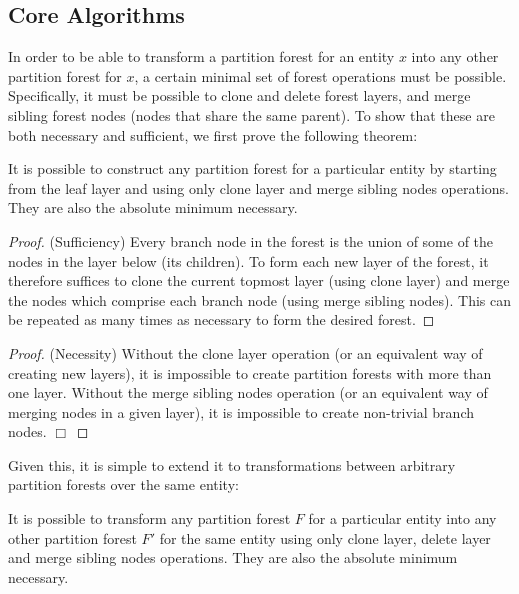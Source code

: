 \subsection{Core Algorithms}

In order to be able to transform a partition forest for an entity $x$ into any other partition forest for $x$, a certain minimal set of forest operations must be possible. Specifically, it must be possible to clone and delete forest layers, and merge sibling forest nodes (nodes that share the same parent). To show that these are both necessary and sufficient, we first prove the following theorem:

\begin{theorem}
\label{thrm:ipfs-construction}
It is possible to construct any partition forest for a particular entity by starting from the leaf layer and using only clone layer and merge sibling nodes operations. They are also the absolute minimum necessary.
\end{theorem}

\begin{proof}
(Sufficiency) Every branch node in the forest is the union of some of the nodes in the layer below (its children). To form each new layer of the forest, it therefore suffices to clone the current topmost layer (using clone layer) and merge the nodes which comprise each branch node (using merge sibling nodes). This can be repeated as many times as necessary to form the desired forest.
\end{proof}

\begin{proof}
(Necessity) Without the clone layer operation (or an equivalent way of creating new layers), it is impossible to create partition forests with more than one layer. Without the merge sibling nodes operation (or an equivalent way of merging nodes in a given layer), it is impossible to create non-trivial branch nodes. $\Box$
\end{proof}

\noindent Given this, it is simple to extend it to transformations between arbitrary partition forests over the same entity:

\begin{theorem}
\label{thrm:ipfs-transformation}
It is possible to transform any partition forest $F$ for a particular entity into any other partition forest $F'$ for the same entity using only clone layer, delete layer and merge sibling nodes operations. They are also the absolute minimum necessary.
\end{theorem}

